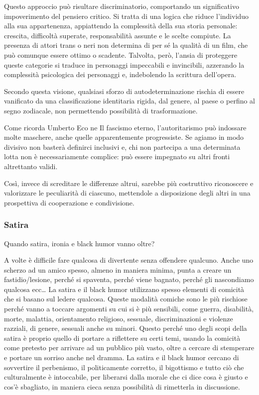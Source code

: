 \documentclass[12pt]{book} %
\begin{document}
Questo approccio può risultare discriminatorio, comportando un significativo impoverimento del pensiero critico. Si tratta di una logica che riduce l’individuo alla sua appartenenza, appiattendo la complessità della sua storia personale: crescita, difficoltà superate, responsabilità assunte e le scelte compiute. La presenza di attori trans o neri non determina di per sé la qualità di un film, che può comunque essere ottimo o scadente. Talvolta, però, l'ansia di proteggere queste categorie si traduce in personaggi impeccabili e invincibili, azzerando la complessità psicologica dei personaggi e, indebolendo la scrittura dell'opera.

Secondo questa visione, qualsiasi sforzo di autodeterminazione rischia di essere vanificato da una classificazione identitaria rigida, dal genere, al paese o perfino al segno zodiacale, non permettendo possibilità di trasformazione.

Come ricorda Umberto Eco ne Il fascismo eterno, l’autoritarismo può indossare molte maschere, anche quelle apparentemente progressiste. Se agiamo in modo divisivo non basterà definirci inclusivi e, chi non partecipa a una determinata lotta non è necessariamente complice: può essere impegnato su altri fronti altrettanto validi.

Così, invece di screditare le differenze altrui, sarebbe più costruttivo riconoscere e valorizzare le peculiarità di ciascuno, mettendole a disposizione degli altri in una prospettiva di cooperazione e condivisione.

\subsubsection{Satira}
Quando satira, ironia e black humor vanno oltre?

A volte è difficile fare qualcosa di divertente senza offendere qualcuno. Anche uno scherzo ad un amico spesso, almeno in maniera minima, punta a creare un fastidio/lesione, perché si spaventa, perché viene bagnato, perché gli nascondiamo qualcosa ecc… La satira e il black humor utilizzano spesso elementi di comicità che si basano sul ledere qualcosa. Queste modalità comiche sono
le più rischiose perché vanno a toccare argomenti su cui si è più sensibili, come
guerra, disabilità, morte, malattia, orientamento religioso, sessuale, discriminazioni e violenze razziali, di genere, sessuali anche su minori. Questo perché uno degli scopi della satira è proprio quello di portare a riflettere su certi temi, usando la comicità come pretesto per arrivare ad un pubblico più vasto, oltre a cercare di stemperare e portare un sorriso anche nel dramma. La satira e il black humor cercano di sovvertire il perbenismo, il politicamente corretto, il
bigottismo e tutto ciò che culturalmente è intoccabile, per liberarsi dalla morale che ci dice cosa è giusto e cos'è sbagliato, in maniera cieca senza possibilità di rimetterla in discussione. 
\end{document}
